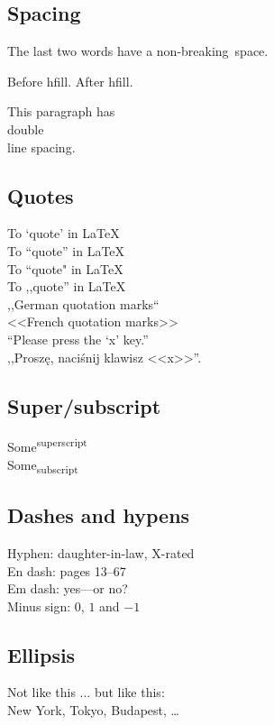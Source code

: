 \documentclass{article}
\begin{document}
  \subsection{Spacing}

  The last two words have a non-breaking~space.

  Before hfill. \hfill After hfill.

  \begin{doublespace}
    This paragraph has \\ double \\ line spacing.
  \end{doublespace}

  \subsection{Quotes}

  To `quote' in LaTeX \\
  To ``quote'' in LaTeX \\
  To ``quote" in LaTeX \\
  To ,,quote'' in LaTeX \\
  ,,German quotation marks`` \\
  <<French quotation marks>> \\
  ``Please press the `x' key.'' \\
  ,,Proszę, naciśnij klawisz <<x>>''.

  \subsection{Super/subscript}

  Some\textsuperscript{superscript} \\
  Some\textsubscript{subscript}

  \subsection{Dashes and hypens}

  Hyphen: daughter-in-law, X-rated\\
  En dash: pages 13--67\\
  Em dash: yes---or no? \\
  Minus sign: $0$, $1$ and $-1$

  \subsection{Ellipsis}

  Not like this ... but like this:\\
  New York, Tokyo, Budapest, \ldots
\end{document}
